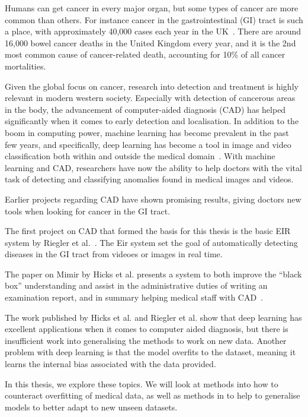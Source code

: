 Humans can get cancer in every major organ, but some types of cancer are more common than others.    
For instance cancer in the gastrointestinal (GI) tract is such a place, with approximately 40,000 cases each year in the UK~\cite{UKCancerBowel}. There are around 16,000 bowel cancer deaths in the United Kingdom every year, and it is the 2nd most common cause of cancer-related death, accounting for 10\% of all cancer mortalities.

Given the global focus on cancer, research into detection and treatment is highly relevant in modern western society. 
Especially with detection of cancerous areas in the body, the advancement of computer-aided diagnosis (CAD) has helped significantly when it comes to early detection and localisation. In addition to the boom in computing power, machine learning has become prevalent in the past few years, and specifically, deep learning has become a tool in image and video classification both within and outside the medical domain~\cite{NIPS2012_4824,DBLP:journals/corr/SimonyanZ14a,DBLP:journals/corr/SimonyanZ14a,DBLP:journals/corr/HeZRS15,DBLP:journals/corr/SzegedyIV16}. 
With machine learning and CAD, researchers have now the ability to help doctors with the vital task of detecting and classifying anomalies found in medical images and videos.

Earlier projects regarding CAD have shown promising results, giving doctors new tools when looking for cancer in the GI tract.

The first project on CAD that formed the basis for this thesis is the basic EIR system by Riegler et al.~\cite{riegler2016eir}.  The Eir system set the goal of automatically detecting diseases in the GI tract from videoes or images in real time. 

The paper on Mimir by Hicks et al. presents a system to both improve the ``black box'' understanding and assist in the administrative duties of writing an examination report, and in summary helping medical staff with CAD~\cite{25953}. 

The work published by Hicks et al. and Riegler et al. show that deep learning has excellent applications when it comes to computer aided diagnosis, but there is insufficient work into generalising the methods to work on new data. Another problem with deep learning is that the model overfits to the dataset, meaning it learns the internal bias associated with the data provided. 

In this thesis, we explore these topics. We will look at methods into how to counteract overfitting of medical data, as well as methods in to help to generalise models to better adapt to new unseen datasets.

